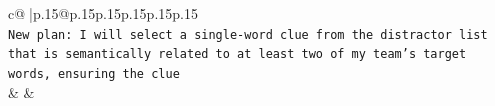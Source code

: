 \documentclass{article}
\begin{document}
{\begin{supertabular}{c@{$\;$}|p{.15\linewidth}@{}p{.15\linewidth}p{.15\linewidth}p{.15\linewidth}p{.15\linewidth}p{.15\linewidth}}
{{{\\ 
\texttt{New plan: I will select a single{-}word clue from the distractor list that is semantically related to at least two of my team's target words, ensuring the clue} \\
            }
        }
    }
    & & \\ \\

\end{supertabular}
}
\end{document}
